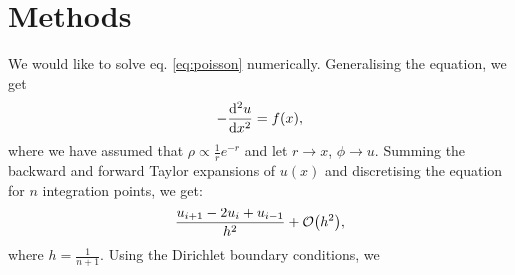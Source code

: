 \section{Methods}
\label{sec:methods}

We would like to solve eq. \ref{eq:poisson} numerically. Generalising the
equation, we get
  \begin{equation}
    -\dv[2]{u}{x} = f\qty(x),
  \end{equation}
where we have assumed that $\rho \propto \frac{1}{r}e^{-r}$ and let $ r
\rightarrow x$, $\phi \rightarrow u$.
Summing the backward and forward Taylor expansions of $u(x)$ and discretising
the equation for $n$ integration points, we get:
  \begin{equation}
    \frac{u_{i+1} - 2u_i + u_{i-1}}{h^2} + \order{h^2},
  \end{equation}
where $h = \frac{1}{n+1}$. Using the Dirichlet boundary conditions, we 
